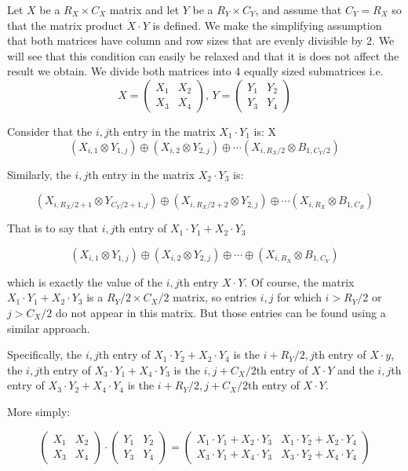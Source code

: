 \documentclass[12pt,twoside]{reedthesis}
\begin{document}
\setlength{\parindent}{0cm}
Let $X$ be a $R_X \times C_X$ matrix and let $Y$ be a $R_Y \times C_Y$, and assume that $C_Y = R_X$ so that the matrix product $X \cdot Y$ is defined. We make the simplifying assumption that both matrices have column and row sizes that are evenly divisible by 2. We will see that this condition can easily be relaxed and that it is does not affect the result we obtain. We divide both matrices into 4 equally sized submatrices i.e. 
$$X = \left(\begin{array}{c|c}X_1 & X_2 \\\hline X_3 & X_4\end{array}\right), \,Y = \left(\begin{array}{c|c}Y_1 & Y_2 \\\hline Y_3 & Y_4\end{array}\right)$$

Consider that the $i,j$th entry in the matrix $X_1 \cdot Y_1$ is:
X
$$
(X_{i,1} \otimes Y_{1,j}) \oplus (X_{i,2} \otimes Y_{2,j}) \oplus \cdots (X_{i,R_X/2} \otimes B_{1,C_Y/2})
$$

Similarly, the $i,j$th entry in the matrix $X_2 \cdot Y_3$ is:

$$
(X_{i,R_X/2 + 1} \otimes Y_{C_Y/2 + 1,j}) \oplus (X_{i,R_X/2 + 2} \otimes Y_{2,j}) \oplus \cdots (X_{i,R_X} \otimes B_{1,C_B})
$$

That is to say that $i,j$th entry of  $X_1 \cdot Y_1 + X_2 \cdot Y_3$

$$
(X_{i,1} \otimes Y_{1,j}) \oplus (X_{i,2} \otimes Y_{2,j}) \oplus \cdots \oplus (X_{i,R_X} \otimes B_{1,C_Y})
$$

which is exactly the value of the $i,j$th entry $X \cdot Y$. Of course, the matrix $X_1 \cdot Y_1 + X_2 \cdot Y_3$ is a $R_Y/2 \times C_X/2$ matrix, so entries $i,j$ for which $i > R_Y/2$ or $j > C_X/2$ do not appear in this matrix. But those entries can be found using a similar approach.

Specifically, the $i,j$th entry of $X_1 \cdot Y_2 + X_2 \cdot Y_4$ is the $i+ R_Y/2,j$th entry of $X \cdot y$, the $i,j$th entry of $X_3 \cdot Y_1 + X_4 \cdot Y_3$ is the $i, j+ C_X/2$th entry of $X \cdot Y$ and the $i,j$th entry of $X_3 \cdot Y_2 + X_4 \cdot Y_4$ is the $i+ R_Y/2,  j+ C_X/2$th entry of $X \cdot Y$.

More simply:

$$\left(\begin{array}{c|c}X_1 & X_2 \\\hline X_3 & X_4\end{array}\right) \cdot\left(\begin{array}{c|c}Y_1 & Y_2 \\\hline Y_3 & Y_4\end{array}\right) = \left(\begin{array}{c|c }X_1 \cdot Y_1 + X_2 \cdot Y_3 & X_1 \cdot Y_2 + X_2 \cdot Y_4 \\\hline X_3 \cdot Y_1 + X_4 \cdot Y_3 & X_3 \cdot Y_2 + X_4 \cdot Y_4 \end{array}\right)$$
\end{document}
